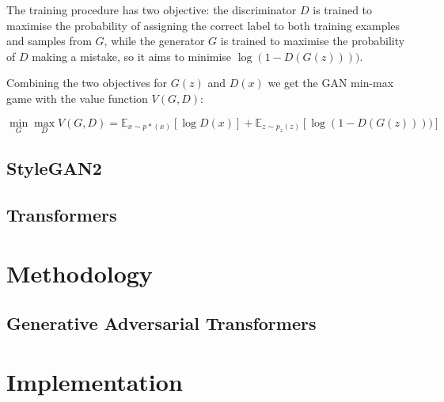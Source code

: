 \documentclass{article}
\begin{document}
	The training procedure has two objective: the discriminator $D$ is trained to maximise the 
	probability of assigning the correct label to both training examples and samples from $G$, 
	while the generator $G$ is trained to maximise the probability of $D$ making a mistake, so it aims to 
	minimise $\log(1-D(G(z))))$.

	Combining the two objectives for $G(z)$ and $D(x)$ we get the GAN min-max game with the value 
	function $V(G,D)$:
	
	\begin{equation}
	\label{e:minmaxgame}
	\min_G \max_D V(G,D) = 
	\mathbb{E}_{x \sim p*(x)} [\log D(x)] + \mathbb E _{z \sim p_z(z)} [\log (1-D(G(z))))]
	\end{equation}
	
	
	
	\subsection{StyleGAN2}
	\cite{karras2019style} \cite{karras2020analyzing}
	
	\subsection{Transformers}
	\cite{vaswani2017attention}
	
	
	\section{Methodology}
	
	\subsection{Generative Adversarial Transformers}
	
	\section{Implementation}
	
\end{document}
